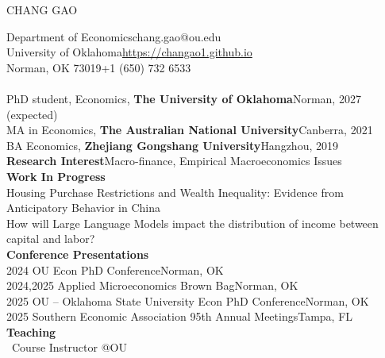 \documentclass[12pt,letterpaper]{article}
\begin{document}
	\begin{center}
		{\Large CHANG GAO}
	\end{center}
	\noindent Department of Economics\hfill chang.gao@ou.edu\medskip\\
	University of Oklahoma\hfill\href{https://changao1.github.io}{https://changao1.github.io}\medskip\\
Norman, OK   73019\hfill+1 (650) 732 6533\bigskip\\
	\medskip\\
	PhD student, Economics, {\bf The University of Oklahoma}\hfill Norman, 2027 (expected)\medskip\\
    MA in Economics, {\bf The Australian National University}\hfill Canberra, 2021\medskip\\
	BA Economics, {\bf Zhejiang Gongshang University}\hfill Hangzhou, 2019\bigskip\\
	{\bf Research Interest}\hfill Macro-finance, Empirical Macroeconomics Issues\bigskip\\
	{\bf Work In Progress}\medskip\\
Housing Purchase Restrictions and Wealth Inequality: Evidence from Anticipatory Behavior in China\smallskip\\
How will Large Language Models impact the distribution of income between capital and labor?\medskip\\
{\bf Conference Presentations}\medskip\\
2024 OU Econ PhD Conference\hfill Norman, OK\smallskip\\
2024,2025 Applied Microeconomics Brown Bag\hfill Norman, OK\smallskip\\
2025 OU -- Oklahoma State University Econ PhD Conference\hfill Norman, OK\smallskip\\
2025 Southern Economic Association 95th Annual Meetings\hfill Tampa, FL\bigskip\\
	{\bf Teaching}\medskip\\
	{\ Course Instructor @OU}
	
\end{document}
